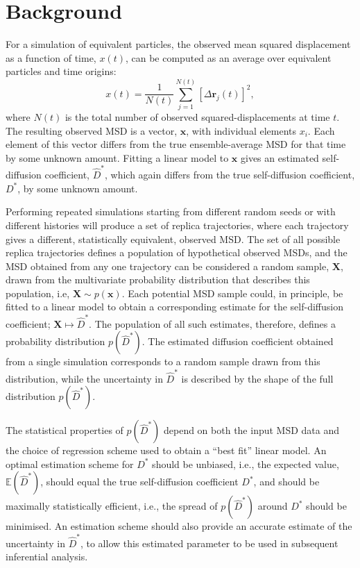 \documentclass[reprint,superscriptaddress,nobibnotes,amsmath,amssymb,aps,prx,hidelinks]{revtex4-2}
\newcommand{\oMSD}{\ensuremath{\bm{x}}}
\newcommand{\oMSDs}[1]{\ensuremath{x}(#1)}
\newcommand{\oMSDi}{\ensuremath{x_i}}
\newcommand{\prob}[1]{\ensuremath{p(#1)}}
\newcommand{\Dest}{\ensuremath{\widehat{D}^*}}
\newcommand{\D}{\ensuremath{D^*}}
\begin{document}
\section{Background}

For a simulation of equivalent particles, the observed mean squared displacement as a function of time, $\oMSDs{t}$, can be computed as an average over equivalent particles and time origins:
\begin{equation}
  \oMSDs{t} = \frac{1}{N(t)}\sum^{N(t)}_{j=1}{\left[\Delta\mathbf{r}_j(t)\right]}^2,
  \label{equ:observed_msd}
\end{equation}
where $N(t)$ is the total number of observed squared-displacements at time $t$.
The resulting observed MSD is a vector, $\oMSD$, with individual elements $\oMSDi$.
Each element of this vector differs from the true ensemble-average MSD for that time by some unknown amount.
Fitting a linear model to $\oMSD$ gives an estimated self-diffusion coefficient, $\Dest$, which again differs from the true self-diffusion coefficient, $\D$, by some unknown amount.

Performing repeated simulations starting from different random seeds or with different histories will produce a set of replica trajectories, where each trajectory gives a different, statistically equivalent, observed MSD.
The set of all possible replica trajectories defines a population of hypothetical observed MSDs, and the MSD obtained from any one trajectory can be considered a random sample, $\bm{X}$, drawn from the multivariate probability distribution that describes this population, i.e, $\bm{X} \sim \prob{\oMSD}$.
Each potential MSD sample could, in principle, be fitted to a linear model to obtain a corresponding estimate for the self-diffusion coefficient; $\bm{X} \mapsto \Dest$.
The population of all such estimates, therefore, defines a probability distribution $\prob{\Dest}$.
The estimated diffusion coefficient obtained from a single simulation corresponds to a random sample drawn from this distribution, while the uncertainty in $\Dest$ is described by the shape of the full distribution $\prob{\Dest}$.

The statistical properties of $p(\Dest)$ depend on both the input MSD data and the choice of regression scheme used to obtain a ``best fit'' linear model.
An optimal estimation scheme for $\D$ should be unbiased, i.e., the expected value, $\mathbb{E}(\Dest)$, should equal the true self-diffusion coefficient $\D$, and should be maximally statistically efficient, i.e., the spread of $p(\Dest)$ around $\D$ should be minimised.
An estimation scheme should also provide an accurate estimate of the uncertainty in $\Dest$, to allow this estimated parameter to be used in subsequent inferential analysis.
\end{document}

